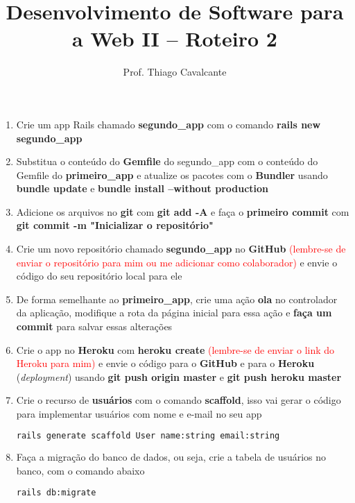\documentclass[a4paper,12pt]{article}
\title{Desenvolvimento de Software para a Web II -- Roteiro 2}
\author{Prof. Thiago Cavalcante}
\date{}
\begin{document}
\maketitle

\sloppy
\raggedright

\begin{enumerate}
  \item Crie um app Rails chamado \textbf{segundo\_app} com o comando \textbf{rails new segundo\_app}
  \item Substitua o conteúdo do \textbf{Gemfile} do segundo\_app com o conteúdo do Gemfile do \textbf{primeiro\_app} e atualize os pacotes com o \textbf{Bundler} usando \textbf{bundle update} e \textbf{bundle install --without production}
  \item Adicione os arquivos no \textbf{git} com \textbf{git add -A} e faça o \textbf{primeiro commit} com \textbf{git commit -m "Inicializar o repositório"}
  \item Crie um novo repositório chamado \textbf{segundo\_app} no \textbf{GitHub} \textcolor{red}{(lembre-se de enviar o repositório para mim ou me adicionar como colaborador)} e envie o código do seu repositório local para ele
  \item De forma semelhante ao \textbf{primeiro\_app}, crie uma ação \textbf{ola} no controlador da aplicação, modifique a rota da página inicial para essa ação e \textbf{faça um commit} para salvar essas alterações
  \item Crie o app no \textbf{Heroku} com \textbf{heroku create} \textcolor{red}{(lembre-se de enviar o link do Heroku para mim)} e envie o código para o \textbf{GitHub} e para o \textbf{Heroku} (\textit{deployment}) usando \textbf{git push origin master} e \textbf{git push heroku master}
  \item Crie o recurso de \textbf{usuários} com o comando \textbf{scaffold}, isso vai gerar o código para implementar usuários com nome e e-mail no seu app

    \begin{lstlisting}[language=Bash, basicstyle=\fontsize{9.8}{12}\selectfont\ttfamily]
rails generate scaffold User name:string email:string
    \end{lstlisting}

  \item Faça a migração do banco de dados, ou seja, crie a tabela de usuários no banco, com o comando abaixo

    \begin{lstlisting}[language=Bash]
rails db:migrate
    \end{lstlisting}


\end{enumerate}
\end{document}

